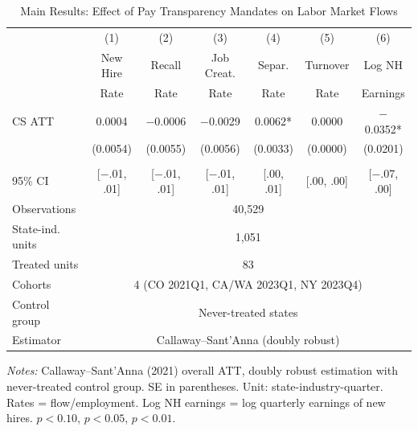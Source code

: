 \begin{table}[H]
\centering
\caption{Main Results: Effect of Pay Transparency Mandates on Labor Market Flows}
\label{tab:main}
\footnotesize
\begin{tabular}{lcccccc}
\toprule
 & (1) & (2) & (3) & (4) & (5) & (6) \\
 & New Hire & Recall & Job Creat. & Separ. & Turnover & Log NH \\
 & Rate & Rate & Rate & Rate & Rate & Earnings \\
\midrule
CS ATT & 0.0004 & $-$0.0006 & $-$0.0029 & 0.0062* & 0.0000 & $-$0.0352* \\
 & (0.0054) & (0.0055) & (0.0056) & (0.0033) & (0.0000) & (0.0201) \\
 & & & & & & \\
{\scriptsize 95\% CI} & {\scriptsize [$-$.01, .01]} & {\scriptsize [$-$.01, .01]} & {\scriptsize [$-$.01, .01]} & {\scriptsize [.00, .01]} & {\scriptsize [.00, .00]} & {\scriptsize [$-$.07, .00]} \\
\midrule
Observations & \multicolumn{6}{c}{40,529} \\
State-ind. units & \multicolumn{6}{c}{1,051} \\
Treated units & \multicolumn{6}{c}{83} \\
Cohorts & \multicolumn{6}{c}{4 (CO 2021Q1, CA/WA 2023Q1, NY 2023Q4)} \\
Control group & \multicolumn{6}{c}{Never-treated states} \\
Estimator & \multicolumn{6}{c}{Callaway--Sant'Anna (doubly robust)} \\
\bottomrule
\end{tabular}
\par\vspace{0.3em}
{\footnotesize \textit{Notes:} Callaway--Sant'Anna (2021) overall ATT, doubly robust estimation with never-treated control group. SE in parentheses. Unit: state-industry-quarter. Rates = flow/employment. Log NH earnings = log quarterly earnings of new hires. \sym{*} \(p<0.10\), \sym{**} \(p<0.05\), \sym{***} \(p<0.01\).}
\end{table}
